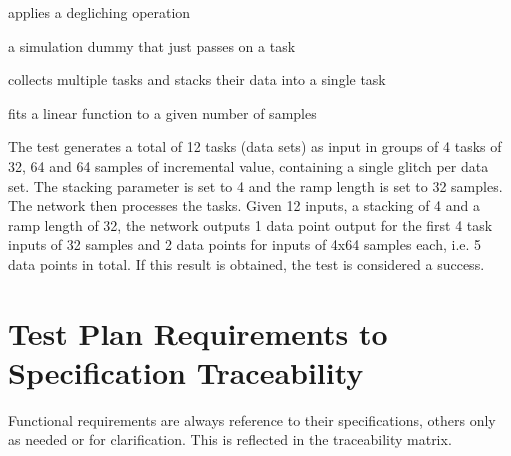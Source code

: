 \begin{description}[labelwidth=4em,leftmargin=\parindent,labelindent=\parindent]
	\item[\textbf{deglitch}] applies a degliching operation
	\item[\textbf{dummy}]	 a simulation dummy that just passes on a task
	\item[\textbf{stack}]	 collects multiple tasks and stacks their data into a single task
	\item[\textbf{rampfit}]	 fits a linear function to a given number of samples
\end{description}

\noindent
The test generates a total of 12 tasks (data sets) as input in groups of 4 tasks
of 32, 64 and 64 samples of incremental value, containing a single glitch per
data set. The stacking parameter is set to 4 and the ramp length is set to 32
samples.\\

\noindent
The network then processes the tasks. Given 12 inputs, a stacking of 4 and a
ramp length of 32, the network outputs 1 data point output for the first 4 task
inputs of 32 samples and 2 data points for inputs of 4x64 samples each,
i.e. 5 data points in total. If this result is obtained, the test is considered
a success.\\







\chapter{Test Plan Requirements to Specification Traceability}

\noindent
Functional requirements are always reference to their specifications, others
only as needed or for clarification. This is reflected in the traceability
matrix.

\traceabilitymatrix


